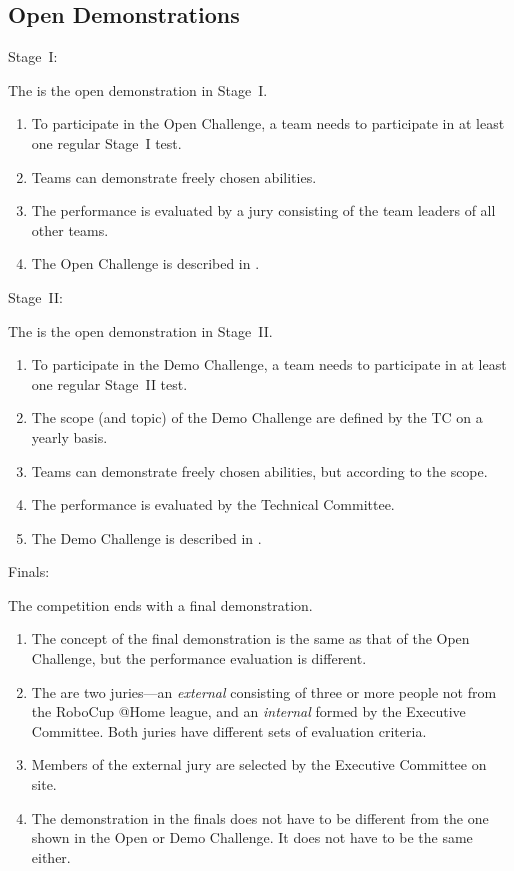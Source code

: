 \subsection{Open Demonstrations}
\begin{enumerate}
  {\bf\item Stage~I:} The  is the open demonstration in Stage~I.
  \begin{enumerate}
  \item To participate in the Open Challenge, a team needs to participate in at least one regular Stage~I test.
  \item Teams can demonstrate freely chosen abilities. 
  \item The performance is evaluated by a jury consisting of the team leaders of all other teams.
  \item The Open Challenge is described in .
  \end{enumerate}
  {\bf\item Stage~II:} The  is the open demonstration in Stage~II.
  \begin{enumerate}
  \item To participate in the Demo Challenge, a team needs to participate in at least one regular Stage~II test.
  \item The scope (and topic) of the Demo Challenge are defined by the TC on a yearly basis.
  \item Teams can demonstrate freely chosen abilities, but according to the scope. 
  \item The performance is evaluated by the Technical Committee.
  \item The Demo Challenge is described in .
  \end{enumerate}
  {\bf\item Finals:} The competition ends with a final demonstration.
  \begin{enumerate}
  \item The concept of the final demonstration is the same as that of the Open Challenge, but the performance evaluation is different. 
  \item The are two juries---an \emph{external} consisting of three or more people not from the RoboCup @Home league, 
    and an \emph{internal} formed by the Executive Committee. Both juries have different sets of evaluation criteria.
  \item Members of the external jury are selected by the Executive Committee on site. 
  \item The demonstration in the finals does not have to be different from the one shown in the Open or Demo Challenge. 
    It does not have to be the same either.
  \end{enumerate}
\end{enumerate}


